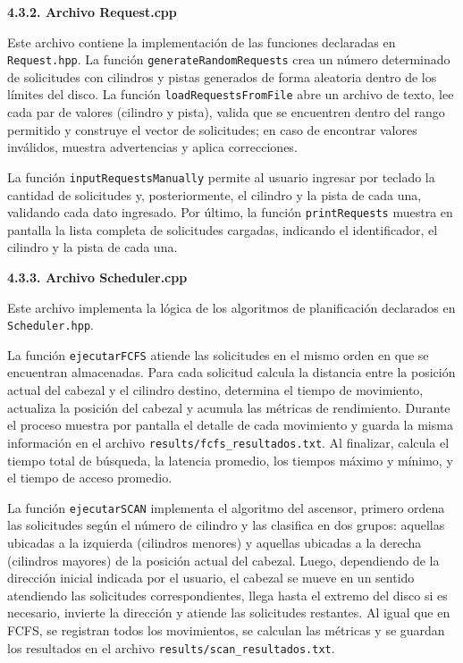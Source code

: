 \documentclass[14pt,letterpaper]{extarticle}
\begin{document}
\textbf{4.3.2. Archivo Request.cpp}

Este archivo contiene la implementación de las funciones declaradas en \texttt{Request.hpp}. La función \texttt{generateRandomRequests} crea un número determinado de solicitudes con cilindros y pistas generados de forma aleatoria dentro de los límites del disco. La función \texttt{loadRequestsFromFile} abre un archivo de texto, lee cada par de valores (cilindro y pista), valida que se encuentren dentro del rango permitido y construye el vector de solicitudes; en caso de encontrar valores inválidos, muestra advertencias y aplica correcciones.

La función \texttt{inputRequestsManually} permite al usuario ingresar por teclado la cantidad de solicitudes y, posteriormente, el cilindro y la pista de cada una, validando cada dato ingresado. Por último, la función \texttt{printRequests} muestra en pantalla la lista completa de solicitudes cargadas, indicando el identificador, el cilindro y la pista de cada una.

\textbf{4.3.3. Archivo Scheduler.cpp}

Este archivo implementa la lógica de los algoritmos de planificación declarados en \texttt{Scheduler.hpp}.

La función \texttt{ejecutarFCFS} atiende las solicitudes en el mismo orden en que se encuentran almacenadas. Para cada solicitud calcula la distancia entre la posición actual del cabezal y el cilindro destino, determina el tiempo de movimiento, actualiza la posición del cabezal y acumula las métricas de rendimiento. Durante el proceso muestra por pantalla el detalle de cada movimiento y guarda la misma información en el archivo \texttt{results/fcfs\_resultados.txt}. Al finalizar, calcula el tiempo total de búsqueda, la latencia promedio, los tiempos máximo y mínimo, y el tiempo de acceso promedio.

La función \texttt{ejecutarSCAN} implementa el algoritmo del ascensor, primero ordena las solicitudes según el número de cilindro y las clasifica en dos grupos: aquellas ubicadas a la izquierda (cilindros menores) y aquellas ubicadas a la derecha (cilindros mayores) de la posición actual del cabezal. Luego, dependiendo de la dirección inicial indicada por el usuario, el cabezal se mueve en un sentido atendiendo las solicitudes correspondientes, llega hasta el extremo del disco si es necesario, invierte la dirección y atiende las solicitudes restantes. Al igual que en FCFS, se registran todos los movimientos, se calculan las métricas y se guardan los resultados en el archivo \texttt{results/scan\_resultados.txt}.
\end{document}
